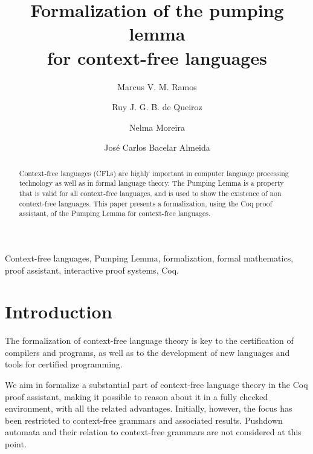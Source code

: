 \documentclass {elsarticle}
\begin{document}
\begin {frontmatter}
\title {Formalization of the pumping lemma \\for context-free languages}
\author{Marcus V. M. Ramos}	
\address{Centro de Informática, UFPE, Recife, Brazil} 

\author{Ruy J. G. B. de Queiroz}
\address{Centro de Informática, UFPE, Recife, Brazil} 

\author{Nelma Moreira}
\address{Departamento de Ciência de Computadores, Faculdade de Ciências, Universidade do Porto, Porto, Portugal} 

\author{José Carlos Bacelar Almeida}
\address{Departamento de Informática, Universidade do Minho, Braga, Portugal} 

\begin {abstract}
Context-free languages (CFLs) are highly important in computer language processing technology as well as in formal language theory. The Pumping Lemma is a property that is valid for all context-free languages, and is used to show the existence of non context-free languages. This paper presents a formalization, using the Coq proof assistant, of the Pumping Lemma for context-free languages.
\end {abstract}

\begin{keyword}
{Context-free languages, Pumping Lemma, formalization, formal mathematics, proof assistant, interactive proof systems, Coq.}
\end{keyword}
\end {frontmatter}

\section {Introduction}
\label {sec-intro}
The formalization of context-free language theory is key to the certification of compilers and programs, as well as to the development of new languages and tools for certified programming. 

We aim in formalize a substantial part of context-free language theory in the Coq proof assistant, making it possible to reason about it in a fully checked environment, with all the related advantages. Initially, however, the focus has been restricted to context-free grammars and associated results. Pushdown automata and their relation to context-free grammars are not considered at this point.
\end{document}
